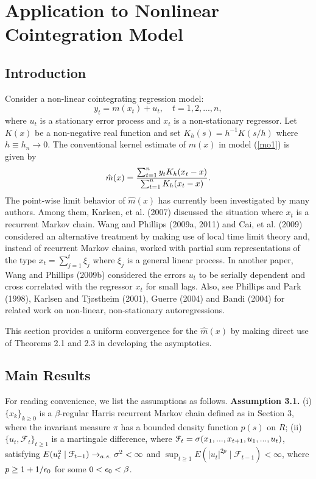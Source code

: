 \chapter{Application to Nonlinear Cointegration Model}
\ifpdf
    \graphicspath{{Chapter3/Chapter3Figs/PNG/}{Chapter3/Chapter3Figs/PDF/}{Chapter3/Chapter3Figs/}}
\else
    \graphicspath{{Chapter3/Chapter3Figs/EPS/}{Chapter3/Chapter3Figs/}}
\fi

\section{Introduction}

Consider a non-linear cointegrating regression model:
\begin{equation}
y_{t}=m(x_{t})+u_{t},\quad t=1,2,...,n,  \label{mo1}
\end{equation}%
where $u_{t}$ is a stationary error process and $x_{t}$ is a
non-stationary
regressor. Let $K(x)$ be a non-negative real function and set $%
K_{h}(s)=h^{-1}K(s/h)$ where $h\equiv h_{n}\rightarrow 0$. The
conventional kernel estimate of $m(x)$ in model (\ref{mo1}) is given
by
\begin{equation}
\hat{m}(x)=\frac{\sum_{t=1}^{n}y_{t}K_{h}(x_{t}-x)}{%
\sum_{t=1}^{n}K_{h}(x_{t}-x)}.  \label{add9}
\end{equation}%
The point-wise  limit behavior of $\hat{m}(x)$ has currently been investigated
by many authors. Among them, Karlsen, et al. (2007) discussed the situation where $x_{t}$ is a recurrent Markov chain.  Wang and Phillips (2009a, 2011) and Cai, et al.
(2009) considered an alternative treatment by making use of local
time limit theory and, instead of recurrent Markov chains, worked
with partial
 sum representations of the type
 $x_t=\sum_{j=1}^t\xi_j$ where $\xi_j$ is a general linear process.
 In  another paper, Wang and Phillips (2009b) considered
  the errors $u_t$  to be serially dependent and
 cross correlated with the regressor $x_t$ for small lags.  Also, see Phillips and Park (1998), Karlsen and Tj\o stheim (2001), Guerre (2004) and Bandi (2004) for
related work on non-linear, non-stationary autoregressions.

This section provides a uniform convergence for the  $\hat{m}(x)$ by making direct use of Theorems 2.1 and 2.3 in developing the asymptotics. 

\section{Main Results}
For reading convenience, we list the assumptions as follows.
\vskip 0.3cm
 \textbf{Assumption 3.1.} (i) $\{x_k\}_{k\ge 0}$ is a $\beta$-regular Harris recurrent Markov chain defined as in Section 3,
where   the invariant measure $\pi$ has a bounded  density function $p(s)$ on $R$;
(ii) $\{u_t, {\mathcal F}_t\}_{t\ge 1}$ is a martingale difference, where ${\mathcal F}_t=\sigma (x_1, ..., x_{t+1}, u_1,...,u_t)$, satisfying
 $E(u_t^2\mid {\mathcal F}_{t-1})\to_{a.s.} \sigma^2<\infty$ and $ \sup_{t\ge 1}E(|u_t|^{2p}\mid {\mathcal F}_{t-1})<\infty$, where  $p\ge 1+1/\epsilon_0$ for some $0<\epsilon_0<\beta$.




